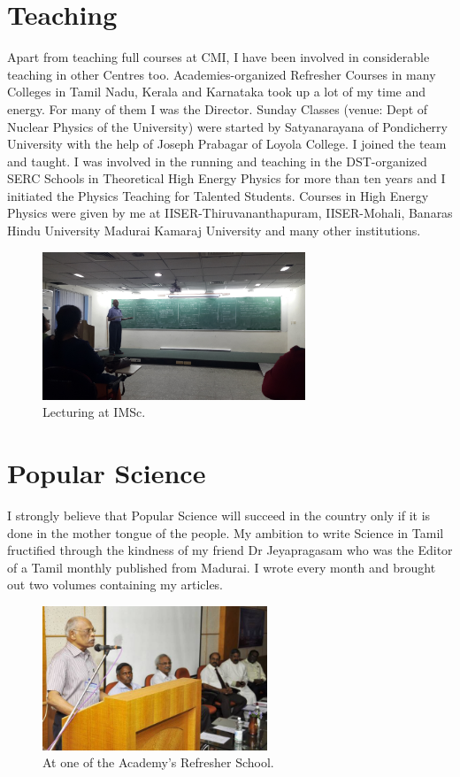 \section*{Teaching}
\vskip -10pt
Apart from teaching full courses at CMI, I have been involved in 
considerable teaching in other Centres too. Academies-organi\-zed 
Refresher Courses in many Colleges in Tamil Nadu, Kerala and Karnataka 
took up a lot of my time and energy. For many of them I was the 
Director. Sunday Classes (venue: Dept of Nuclear Physics of the 
University) were started by Satyanarayana of Pondicherry University with 
the help of Joseph Prabagar of Loyola College. I joined the team and 
taught. I was involved in the running and teaching in the DST-organized 
SERC Schools in Theoretical High Energy Physics for more than ten years 
and I initiated the Physics Teaching for Talented Students. Courses in 
High Energy Physics were given by me at IISER-Thiruvanantha\-puram, 
IISER-Mohali, Banaras Hindu University Madurai Kamaraj University and 
many other institutions.

\begin{figure}[h]
\centering
\includegraphics[width=0.7\textwidth]{images/rajaji-teach1.jpg}
\caption{Lecturing at IMSc.}
\end{figure}

\section*{Popular Science}
\vskip -10pt
I strongly believe that Popular Science will succeed in the country only if it is done in the mother tongue of the people. My ambition to write Science in Tamil fructified through the kindness of my friend Dr Jeyapragasam who was the Editor of a Tamil monthly published from Madurai. I wrote every month and brou\-ght out two volumes containing my articles.

\begin{figure}[h]
\centering
\includegraphics[width=0.6\textwidth]{images/Rajaji-outreach-1.jpg}
\caption{\small{At one of the Academy's Refresher School.}}
\end{figure}

